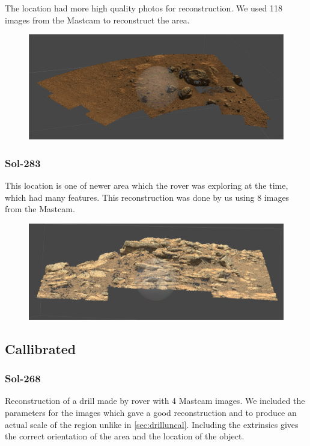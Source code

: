 The location had more high quality photos for reconstruction. We used 118 images from the Mastcam to reconstruct the area. 

\begin{figure}[H]

	\centering
	\includegraphics[scale=0.3]{img/sol42.png}
	\label{fig:sol54}
	\caption{}
\end{figure}
\subsubsection{Sol-283}

This location is one of newer area which the rover was exploring at the time, which had many features. This reconstruction was done by us using 8 images from the Mastcam.
\begin{figure}[H]
	\centering
	\includegraphics[scale=0.3]{img/sol2283.png}
	\label{fig:sol283}
	\caption{}
\end{figure}

\subsection{Callibrated}

\subsubsection{Sol-268}

Reconstruction of a drill made by rover with 4 Mastcam images. We included the parameters for the images which gave a good reconstruction and to produce an actual scale of the region unlike in \ref{sec:drilluncal}. Including the extrinsics gives the correct orientation of the area and the location of the object.

